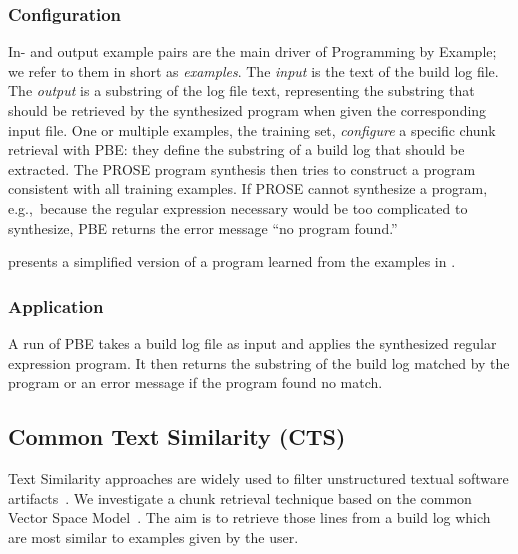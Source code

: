 \subsubsection{Configuration}
In- and output example pairs are the main driver of Programming by
Example; we refer to them in short as \emph{examples}.
The \emph{input} is the text of the build log file.
The \emph{output} is
a substring of the log file text, representing the
substring that should be retrieved by the synthesized program when
given the corresponding input file.
One or multiple examples, the
training set, \emph{configure} a specific chunk retrieval with PBE:
they define the substring of a build log that should be extracted.
The PROSE program synthesis then tries to construct a program
consistent with all training examples.
If PROSE cannot synthesize a program, e.g.,\
because the regular expression
necessary would be too complicated to synthesize, PBE returns the
error message ``no program found.''

 presents a simplified version
of a program learned from the examples in \Cref{lst:chunk-example}.

\subsubsection{Application}
A run of PBE takes a build log file as input and applies the
synthesized regular expression program.
It then returns the substring
of the build log matched by the program or an error message if the
program found no match. 


\subsection{Common Text Similarity (CTS)}
Text Similarity approaches are widely used to filter unstructured
textual software artifacts~\cite{runeson2007detection,
marcus2005recovery,antoniol2002recovering,mccarey2006recommending}.
We investigate a chunk retrieval technique based on the common
Vector Space Model~\cite{schutze2008introduction}.
The aim is to retrieve those lines from a build log which are most
similar to examples given by the user.

